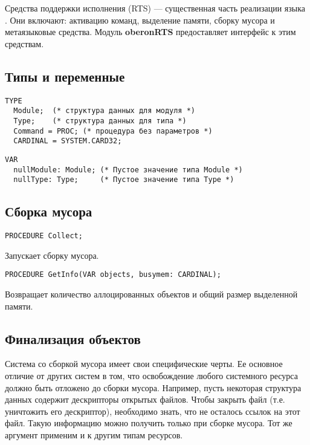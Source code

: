 Средства поддержки исполнения (RTS) --- существенная часть реализации
языка \ot{}. Они включают: активацию команд, выделение памяти,
сборку мусора и метаязыковые средства. 
Модуль {\bf oberonRTS} предоставляет интерфейс к этим средствам.

\subsection{Типы и переменные}
\begin{verbatim}
TYPE
  Module;  (* структура данных для модуля *)
  Type;    (* структура данных для типа *)
  Command = PROC; (* процедура без параметров *)
  CARDINAL = SYSTEM.CARD32;
\end{verbatim}

\begin{verbatim}
VAR
  nullModule: Module; (* Пустое значение типа Module *)
  nullType: Type;     (* Пустое значение типа Type *)
\end{verbatim}

\subsection{Сборка мусора}

\begin{verbatim}
PROCEDURE Collect;
\end{verbatim}
Запускает сборку мусора.

\begin{verbatim}
PROCEDURE GetInfo(VAR objects, busymem: CARDINAL);
\end{verbatim}
Возвращает количество аллоцированных объектов 
и общий размер выделенной памяти.

\subsection{Финализация объектов}

Система со сборкой мусора имеет свои специфические черты.
Ее основное отличие от других систем в том, что освобождение
любого системного ресурса должно быть отложено до сборки мусора.
Например, пусть некоторая структура данных содержит 
дескрипторы открытых файлов. Чтобы закрыть файл (т.е. уничтожить
его дескриптор), необходимо знать, что не осталось ссылок на этот файл.
Такую информацию можно получить только при сборке мусора.
Тот же аргумент применим и к другим типам ресурсов.

